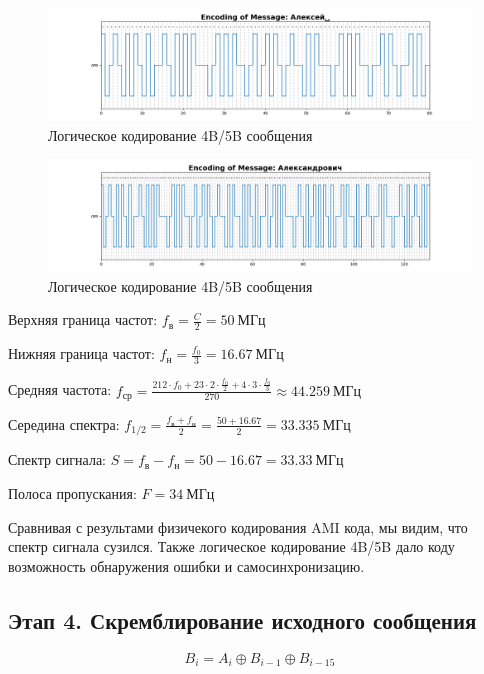 \documentclass[12pt,onecolumn]{article}
\begin{document}
\begin{figure}[H]
    \centering
    \includegraphics[width=\textwidth]{image/encoding_2-2.png}
    \caption{Логическое кодирование 4B/5B сообщения}
\end{figure}
\begin{figure}[H]
    \centering
    \includegraphics[width=\textwidth]{image/encoding_2-3.png}
    \caption{Логическое кодирование 4B/5B сообщения}
\end{figure}

Верхняя граница частот: $f_{\text{в}} = \frac{C}{2} = 50~ \text{МГц}$

Нижняя граница частот: $f_{\text{н}} = \frac{f_0}{3} = 16.67 ~ \text{МГц}$

Средняя частота: $f_{\text{ср}} = \frac{212\cdot f_0 + 23\cdot 2\cdot \frac{f_0}{2} + 4\cdot3 \cdot \frac{f_0}{3}}{270} \approx 44.259~\text{МГц}$

Середина спектра: $f_{1/2} = \frac{f_{\text{в}} + f_{\text{н}}}{2} = \frac{50 + 16.67}{2} = 33.335~\text{МГц}$

Спектр сигнала: $S = f_{\text{в}} - f_{\text{н}} = 50 - 16.67 = 33.33~\text{МГц}$

Полоса пропускания: $F = 34~ \text{МГц}$

Сравнивая с результами физичекого кодирования AMI кода, мы видим, что спектр сигнала сузился. Также логическое кодирование 4B/5B дало коду возможность обнаружения ошибки и самосинхронизацию.



\subsection{Этап 4. Скремблирование исходного сообщения}
$$B_i = A_i \oplus B_{i-1} \oplus B_{i-15}$$
\end{document}
